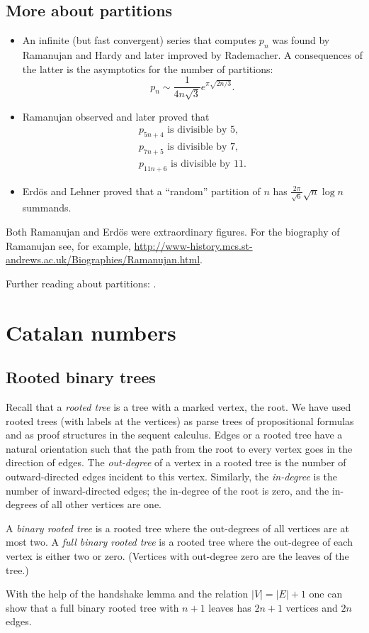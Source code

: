 \begin{page}

\subsection{More about partitions}
\begin{itemize}
\item 
An infinite (but fast convergent) series that computes $p_n$ was found by Ramanujan and Hardy and later improved by Rademacher.
A consequences of the latter is the asymptotics for the number of partitions:
\[
p_n \sim \frac{1}{4n\sqrt{3}} e^{\pi\sqrt{2n/3}}.
\]
\item
Ramanujan observed and later proved that
\begin{gather*}
p_{5n+4} \text{ is divisible by } 5,\\
p_{7n+5} \text{ is divisible by } 7,\\
p_{11n+6} \text{ is divisible by } 11.
\end{gather*}
\item
Erd\"os and Lehner proved that a ``random'' partition of $n$ has $\frac{2\pi}{\sqrt{6}} \sqrt{n} \log n$ summands.
\end{itemize}

Both Ramanujan and Erd\"os were extraordinary figures.
For the biography of Ramanujan see, for example,
\url{http://www-history.mcs.st-andrews.ac.uk/Biographies/Ramanujan.html}.

Further reading about partitions: \cite{AE04}.


\newpage

\section{Catalan numbers}
\subsection{Rooted binary trees}
Recall that a \emph{rooted tree} is a tree with a marked vertex, the root.
We have used rooted trees (with labels at the vertices) as parse trees of propositional formulas
and as proof structures in the sequent calculus.
Edges or a rooted tree have a natural orientation such that the path from the root to every vertex goes in the direction of edges.
The \emph{out-degree} of a vertex in a rooted tree is the number of outward-directed edges incident to this vertex.
Similarly, the \emph{in-degree} is the number of inward-directed edges; the in-degree of the root is zero, and the in-degrees of all other vertices are one.

A \emph{binary rooted tree} is a rooted tree where the out-degrees of all vertices are at most two.
A \emph{full binary rooted tree} is a rooted tree where the out-degree of each vertex is either two or zero.
(Vertices with out-degree zero are the leaves of the tree.)

With the help of the handshake lemma and the relation $|V| = |E| + 1$ one can show that
a full binary rooted tree with $n+1$ leaves has $2n+1$ vertices and $2n$ edges.


\end{page}

